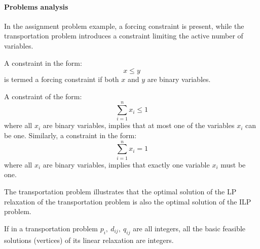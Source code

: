 \paragraph*{Problems analysis}
In the assignment problem example, a forcing constraint is present, while the transportation problem introduces a constraint limiting the active number of variables.
\begin{definition}
    A constraint in the form: 
    \[ \displaystyle x \leq y\]
    is termed a forcing constraint if both $x$ and $y$ are binary variables.
\end{definition}
\begin{definition}
    A constraint of the form:
    \[ \displaystyle \sum_{i=1}^n x_i \leq 1 \]
    where all $x_i$ are binary variables, implies that at most one of the variables $x_i$ can be one. 
    Similarly, a constraint in the form: 
    \[ \displaystyle \sum_{i=1}^n x_i = 1 \]
    where all $x_i$ are binary variables, implies that exactly one variable $x_i$ must be one.
\end{definition}
The transportation problem illustrates that the optimal solution of the LP relaxation of the transportation problem is also the optimal solution of the ILP problem.
\begin{theorem}
    If in a transportation problem $p_i, \ d_{ij}, \ q_{ij}$ are all integers, all the basic feasible solutions (vertices) of its linear relaxation are integers.
\end{theorem}
